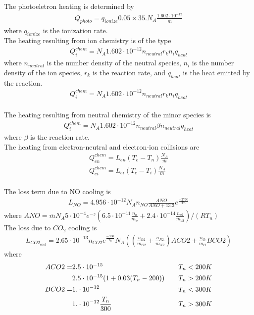 \documentclass[12pt]{book}
\begin{document}
The photoeletron heating is determined by
%
\begin{align}
  Q_{photo} = q_{ionize} 0.05 \times 35. N_A  \frac{1.602\cdot 10^{-12}}{\bar{m}}  
\end{align}
%
where  $q_{ionize}$ is the ionization rate.
%
\\
The heating resulting from ion chemistry is of the type
%
\begin{align}
  Q_{i}^{chem} = N_A 1.602\cdot 10^{-12}n_{neutral}r_k n_i q_{heat}  
\end{align}
%
where $n_{neutral}$ is the number density of the neutral species, $n_i$ is the
number density of the ion species, $r_k$ is the reaction rate, and $q_{heat}$ is
the heat emitted by the reaction. 
%
\begin{align}
  Q_{i}^{chem} = N_A 1.602\cdot 10^{-12}n_{neutral}r_k n_i q_{heat}  
\end{align}
%
\\
The heating resulting from neutral chemistry of the minor species is
%
\begin{align}
  Q_{i}^{chem} = N_A 1.602\cdot 10^{-12}n_{neutral}\beta n_{neutral} q_{heat}  
\end{align}
%
where $\beta$ is the reaction rate.
%
\\
The heating from electron-neutral and electron-ion collisions are
%
\begin{align}
  Q_{en}^{chem} = L_{en}(T_e-T_n) \frac{N_A}{\bar{m}} \\
  Q_{ei}^{chem} = L_{ei}(T_e-T_i) \frac{N_A}{\bar{m}} 
\end{align}
%
\\
The loss term due to NO cooling is
%
\begin{align}
  L_{NO} = 4.956 \cdot 10^{-12} N_A n_{NO}\frac{ANO}{ANO + 13.3} e^{\frac{-2700}{Tn}}
\end{align}
%
where $ANO = \bar{m} N_A 5 \cdot 10^{-4} e^{-z}(6.5 \cdot 10^{-11}\frac{n_o}{m_o} +
2.4 \cdot 10^{-14}\frac{n_{o2}}{m_{o2}})/(R T_n)$
%
\\
The loss due to $CO_2$ cooling is
%
\begin{align}
  L_{CO2_{cool}} = 2.65 \cdot 10^{-13} n_{CO2} e^{\frac{-960}{T_n}} N_A 
     ((\frac{n_{O2}}{m_{O2}} + \frac{n_{N2}}{m_{N2}})ACO2 + \frac{n_{O}}{m_{O}} BCO2)
\end{align}
%
where 
%
\begin{align}
   ACO2 = & 2.5 \cdot 10^{-15} & \quad T_n < 200 K \notag \\
   {}     &2.5 \cdot 10^{-15}(1+0.03(T_n-200))& \quad T_n > 200 K \notag \\
   BCO2 = & 1.\cdot 10^{-12} & \quad  T_n < 300 K  \notag\\
   {}     &1.\cdot 10^{-12}\frac{T_n}{300}& \quad T_n > 300 K \notag 
\end{align}
\end{document}
